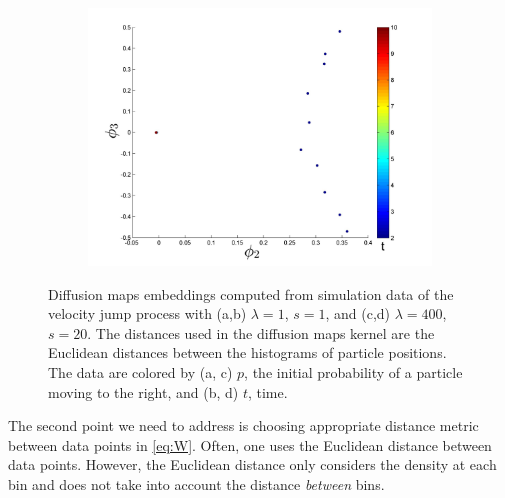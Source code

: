 \documentclass[prl, reprint, final, showkeys]{revtex4-1}
\begin{document}
\begin{figure}[t]
\begin{subfigure}{0.2\textwidth}
\caption{}
\end{subfigure}
\begin{subfigure}{0.2\textwidth}
\includegraphics[width=\textwidth]{rawhist_t_400}
\caption{}
\end{subfigure}
\caption{Diffusion maps embeddings computed from simulation data of the velocity jump process with (a,b) $\lambda=1$, $s=1$, and (c,d) $\lambda=400$, $s=20$. The distances used in the diffusion maps kernel are the Euclidean distances between the histograms of particle positions. The data are colored by (a, c) $p$, the initial probability of a particle moving to the right, and (b, d) $t$, time.}
\label{fig:dmaps_embed_noemd}
\end{figure}

The second point we need to address is choosing appropriate distance metric between data points in \eqref{eq:W}.
%
Often, one uses the Euclidean distance between data points.
%
However, the Euclidean distance only considers the density at each bin and does not take into account the distance {\em between} bins.
%
%
\end{document}
